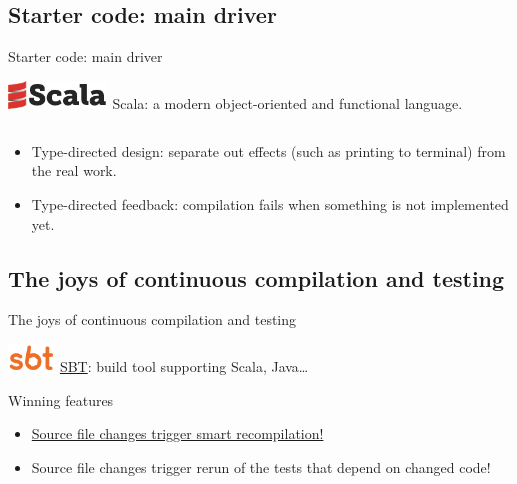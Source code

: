 \subsection{Starter code: main driver}

\begin{frame}[fragile]{Starter code: main driver}
  \begin{block}{\includegraphics[height=0.75cm]{scala-logo-red-dark.png}}
    Scala: a modern \alert{object-oriented} and \alert{functional} language.
  \end{block}

  \inputminted{scala}{Main1.scala}

  \begin{itemize}
  \item Type-directed design: separate out effects (such as printing to terminal) from the real work.
  \item Type-directed feedback: compilation fails when something is not implemented yet.
  \end{itemize}
\end{frame}

\subsection{The joys of continuous compilation and testing}

\begin{frame}[fragile]{The joys of continuous compilation and testing}
  \begin{block}{\includegraphics[height=0.75cm]{sbt-logo-orange-600x360.png}}
    \href{http://www.scala-sbt.org/}{SBT}: build tool supporting Scala, Java\dots
  \end{block}

  \begin{block}{Winning features}
    \begin{itemize}
    \item \href{http://www.scala-sbt.org/release/docs/Detailed-Topics/Triggered-Execution.html}{Source file changes trigger smart recompilation!}
    \item Source file changes trigger rerun of the tests that depend on changed code!
    \end{itemize}
  \end{block}

  \inputminted{console}{testQuick.console}
\end{frame}

